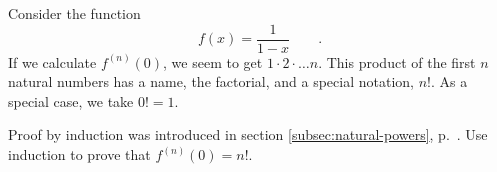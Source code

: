 Consider the function 
\begin{equation*}
  f(x) = \frac{1}{1-x} \qquad .
\end{equation*}
If we calculate $f^{(n)}(0)$, we seem to get
$1\cdot2\cdot\ldots n$. This product of the first $n$ natural numbers
has a name, the factorial, and a special notation, $n!$. As a special
case, we take $0!=1$.

Proof by induction was introduced in section \ref{subsec:natural-powers}, p.~\pageref{induction}.
Use induction to prove that $f^{(n)}(0)=n!$.

